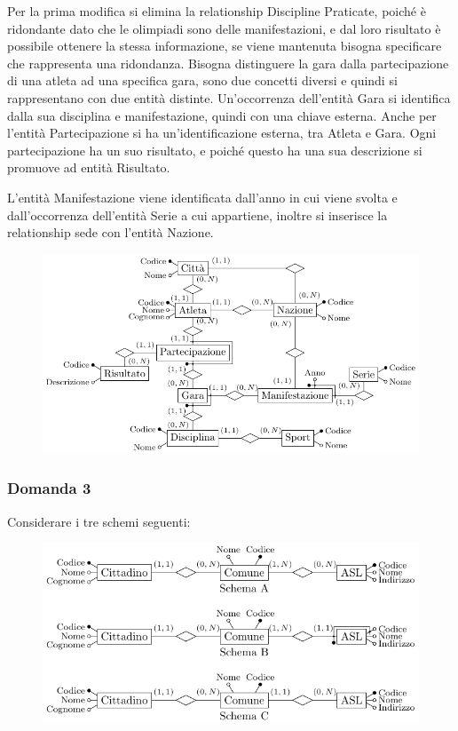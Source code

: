 \documentclass{article}
\begin{document}
Per la prima modifica si elimina la relationship Discipline Praticate, poiché è ridondante dato che le olimpiadi sono delle manifestazioni, e dal loro risultato è possibile ottenere la stessa informazione, se viene mantenuta bisogna specificare che rappresenta una ridondanza. Bisogna distinguere la gara dalla partecipazione di una atleta ad una specifica gara, sono due concetti diversi e quindi si rappresentano con due entità distinte. 
Un'occorrenza dell'entità Gara si identifica dalla sua disciplina e manifestazione, quindi con una chiave esterna. Anche per l'entità Partecipazione si ha un'identificazione esterna, tra Atleta e Gara. Ogni partecipazione ha un suo risultato, e poiché questo ha una sua descrizione si promuove ad entità Risultato. 

L'entità Manifestazione viene identificata dall'anno in cui viene svolta e dall'occorrenza dell'entità Serie a cui appartiene, inoltre si inserisce la relationship sede con l'entità Nazione. 



\begin{figure}[H]%
    \centering%
    \includegraphics{schema_2_16-12-24.pdf}%
\end{figure}

\subsubsection*{Domanda 3}

Considerare i tre schemi seguenti:

\begin{figure}[H]%
    \centering%
    \includegraphics{schema_3_16-12-24.pdf}%
\end{figure}
\end{document}
